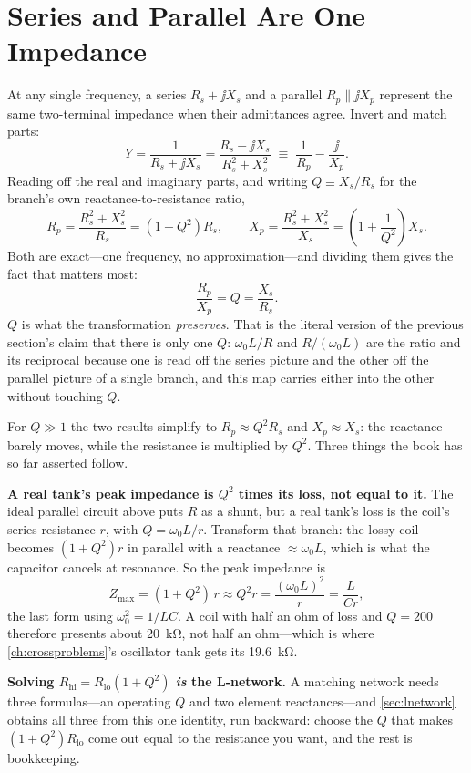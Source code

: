 \section{Series and Parallel Are One Impedance}
\label{sec:seriesparallel}
At any single frequency, a series \(R_s+\jj X_s\) and a parallel
\(R_p\parallel\jj X_p\) represent the same two-terminal impedance when their
admittances agree. Invert and match parts:
\[
Y=\frac{1}{R_s+\jj X_s}=\frac{R_s-\jj X_s}{R_s^2+X_s^2}
\;\equiv\;\frac{1}{R_p}-\frac{\jj}{X_p} .
\]
Reading off the real and imaginary parts, and writing \(Q\equiv X_s/R_s\) for the
branch's own reactance-to-resistance ratio,
\[
R_p=\frac{R_s^2+X_s^2}{R_s}=\left(1+Q^2\right)R_s,
\qquad
X_p=\frac{R_s^2+X_s^2}{X_s}=\left(1+\frac{1}{Q^2}\right)X_s .
\]
Both are exact---one frequency, no approximation---and dividing them gives the fact
that matters most:
\[
\frac{R_p}{X_p}=Q=\frac{X_s}{R_s}.
\]
\(Q\) is what the transformation \emph{preserves}. That is the literal version of the
previous section's claim that there is only one \(Q\): \(\omega_0L/R\) and
\(R/(\omega_0L)\) are the ratio and its reciprocal because one is read off the series
picture and the other off the parallel picture of a single branch, and this map
carries either into the other without touching \(Q\).

For \(Q\gg1\) the two results simplify to \(R_p\approx Q^2R_s\) and
\(X_p\approx X_s\): the reactance barely moves, while the resistance is multiplied by
\(Q^2\). Three things the book has so far asserted follow.

\textbf{A real tank's peak impedance is \(Q^2\) times its loss, not equal to it.}
The ideal parallel circuit above puts \(R\) as a shunt, but a real tank's loss is the
coil's series resistance \(r\), with \(Q=\omega_0L/r\). Transform that branch: the
lossy coil becomes \((1+Q^2)r\) in parallel with a reactance \(\approx\omega_0L\),
which is what the capacitor cancels at resonance. So the peak impedance is
\[
Z_{\max}=(1+Q^2)\,r\approx Q^2r=\frac{(\omega_0L)^2}{r}=\frac{L}{Cr},
\]
the last form using \(\omega_0^2=1/LC\). A coil with half an ohm of loss and
\(Q=200\) therefore presents about \SI{20}{\kilo\ohm}, not half an ohm---which is
where \cref{ch:crossproblems}'s oscillator tank gets its \SI{19.6}{\kilo\ohm}.

\textbf{Solving \(R_{\text{hi}}=R_{\text{lo}}(1+Q^2)\) \emph{is} the L-network.}
A matching network needs three formulas---an operating \(Q\) and two element
reactances---and \cref{sec:lnetwork} obtains all three from this one identity, run
backward: choose the \(Q\) that makes \((1+Q^2)R_{\text{lo}}\) come out equal to the
resistance you want, and the rest is bookkeeping.

